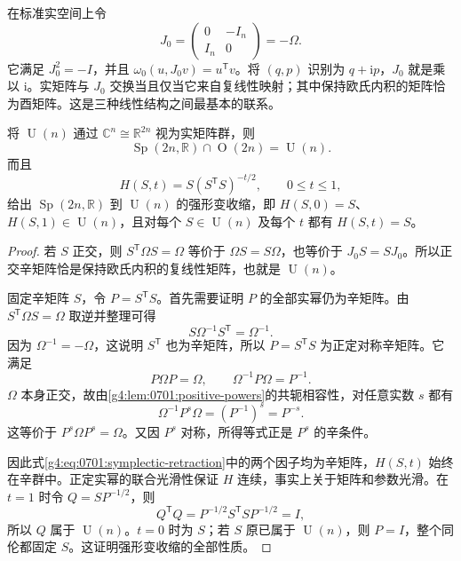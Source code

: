 在标准实空间上令
\begin{equation}\label{g4:eq:0701:standard-complex-matrix}
	J_0=\begin{pmatrix}0&-I_n\\I_n&0\end{pmatrix}=-\Omega.
\end{equation}
它满足 \(J_0^2=-I\)，并且 \(\omega_0(u,J_0v)=u^{\mathsf T}v\)。将 \((q,p)\) 识别为 \(q+\mathrm{i}p\)，\(J_0\) 就是乘以 \(\mathrm{i}\)。实矩阵与 \(J_0\) 交换当且仅当它来自复线性映射；其中保持欧氏内积的矩阵恰为酉矩阵。这是三种线性结构之间最基本的联系。\cite[第3.1节，第108页]{Cannas2006Symplectic}

\begin{theorem}\label{g4:thm:0701:symplectic-retraction}
	将 \(\operatorname{U}(n)\) 通过 \(\mathbb C^n\cong\mathbb R^{2n}\) 视为实矩阵群，则
	\[
		\operatorname{Sp}(2n,\mathbb R)\cap\operatorname{O}(2n)=\operatorname{U}(n).
	\]
	而且
	\begin{equation}\label{g4:eq:0701:symplectic-retraction}
		H(S,t)=S(S^{\mathsf T}S)^{-t/2},\qquad 0\le t\le1,
	\end{equation}
	给出 \(\operatorname{Sp}(2n,\mathbb R)\) 到 \(\operatorname{U}(n)\) 的强形变收缩，即 \(H(S,0)=S\)、\(H(S,1)\in\operatorname{U}(n)\)，且对每个 \(S\in\operatorname{U}(n)\) 及每个 \(t\) 都有 \(H(S,t)=S\)。
\end{theorem}
\begin{proof}
	若 \(S\) 正交，则 \(S^{\mathsf T}\Omega S=\Omega\) 等价于 \(\Omega S=S\Omega\)，也等价于 \(J_0S=SJ_0\)。所以正交辛矩阵恰是保持欧氏内积的复线性矩阵，也就是 \(\operatorname{U}(n)\)。

	固定辛矩阵 \(S\)，令 \(P=S^{\mathsf T}S\)。首先需要证明 \(P\) 的全部实幂仍为辛矩阵。由 \(S^{\mathsf T}\Omega S=\Omega\) 取逆并整理可得
	\[
		S\Omega^{-1}S^{\mathsf T}=\Omega^{-1}.
	\]
	因为 \(\Omega^{-1}=-\Omega\)，这说明 \(S^{\mathsf T}\) 也为辛矩阵，所以 \(P=S^{\mathsf T}S\) 为正定对称辛矩阵。它满足
	\[
		P\Omega P=\Omega,
		\qquad \Omega^{-1}P\Omega=P^{-1}.
	\]
	\(\Omega\) 本身正交，故由\cref{g4:lem:0701:positive-powers}的共轭相容性，对任意实数 \(s\) 都有
	\[
		\Omega^{-1}P^s\Omega=(P^{-1})^s=P^{-s}.
	\]
	这等价于 \(P^s\Omega P^s=\Omega\)。又因 \(P^s\) 对称，所得等式正是 \(P^s\) 的辛条件。

	因此式\eqref{g4:eq:0701:symplectic-retraction}中的两个因子均为辛矩阵，\(H(S,t)\) 始终在辛群中。正定实幂的联合光滑性保证 \(H\) 连续，事实上关于矩阵和参数光滑。在 \(t=1\) 时令 \(Q=SP^{-1/2}\)，则
	\[
		Q^{\mathsf T}Q=P^{-1/2}S^{\mathsf T}SP^{-1/2}=I,
	\]
	所以 \(Q\) 属于 \(\operatorname{U}(n)\)。\(t=0\) 时为 \(S\)；若 \(S\) 原已属于 \(\operatorname{U}(n)\)，则 \(P=I\)，整个同伦都固定 \(S\)。这证明强形变收缩的全部性质。
\end{proof}

